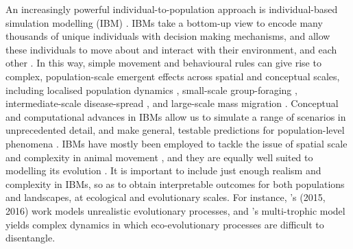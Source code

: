 \documentclass[11pt]{article}
\begin{document}
An increasingly powerful individual-to-population approach is individual-based simulation modelling (IBM) \citep{deangelis2005,deangelis2018,grimm2017,railsback2020,huston1988}.
IBMs take a bottom-up view to encode many thousands of unique individuals with decision making mechanisms, and allow these individuals to move about and interact with their environment, and each other \citep{huston1988,deangelis2019}.
In this way, simple movement and behavioural rules can give rise to complex, population-scale emergent effects across spatial and conceptual scales, including localised population dynamics \citep{stillman2010}, small-scale group-foraging \citep{amano2006,zurell2015}, intermediate-scale disease-spread \citep{scherer2020,jeltsch1997}, and large-scale mass migration \citep{guttal2010}.
Conceptual and computational advances in IBMs \citep[][]{deangelis2018,deangelis2005} allow us to simulate a range of scenarios in unprecedented detail, and make general, testable predictions for population-level phenomena \citep[e.g. animal space use, or life-history strategies; see][]{spiegel2017,schaefer2018}.
IBMs have mostly been employed to tackle the issue of spatial scale and complexity in animal movement \citep{spiegel2017}, and they are equally well suited to modelling its evolution \citep{netz2020,guttal2010,getz2016,getz2015}.
It is important to include just enough realism and complexity in IBMs, so as to obtain interpretable outcomes for both populations and landscapes, at ecological and evolutionary scales.
For instance, \citeauthor{getz2015}'s (2015, 2016) work models unrealistic evolutionary processes, and \citeauthor{netz2020}'s multi-trophic model yields complex dynamics in which eco-evolutionary processes are difficult to disentangle.
\end{document}

